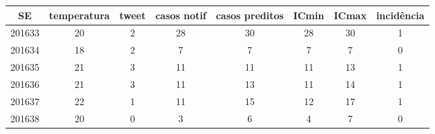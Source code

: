 \begin{tabular}{c|ccccccc}
  \hline
SE & temperatura & tweet & casos notif & casos preditos & ICmin & ICmax & incidência \\ 
  \hline
201633 & 20 & 2 & 28 & 30 & 28 & 30 & 1 \\ 
  201634 & 18 & 2 & 7 & 7 & 7 & 7 & 0 \\ 
  201635 & 21 & 3 & 11 & 11 & 11 & 13 & 1 \\ 
  201636 & 21 & 3 & 11 & 13 & 11 & 14 & 1 \\ 
  201637 & 22 & 1 & 11 & 15 & 12 & 17 & 1 \\ 
  201638 & 20 & 0 & 3 & 6 & 4 & 7 & 0 \\ 
   \hline
\end{tabular}
